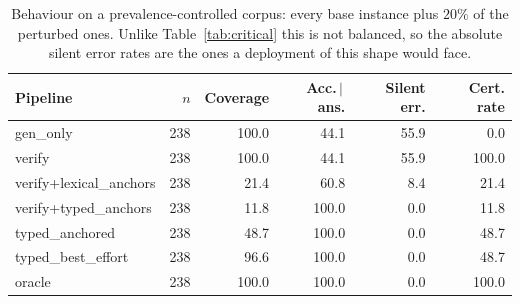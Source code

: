 \begin{table}[t]
\centering
\caption{Behaviour on a prevalence-controlled corpus: every base instance plus $20\%$ of the perturbed ones. Unlike Table~\ref{tab:critical} this is not balanced, so the absolute silent error rates are the ones a deployment of this shape would face.}
\label{tab:mixed}
\small
\begin{tabular}{lrrrrr}
\toprule
Pipeline & $n$ & Coverage & Acc.\,$\mid$\,ans. & Silent err. & Cert. rate \\
\midrule
gen\_only & 238 & 100.0 & 44.1 & 55.9 & 0.0 \\
verify & 238 & 100.0 & 44.1 & 55.9 & 100.0 \\
verify+lexical\_anchors & 238 & 21.4 & 60.8 & 8.4 & 21.4 \\
verify+typed\_anchors & 238 & 11.8 & 100.0 & 0.0 & 11.8 \\
typed\_anchored & 238 & 48.7 & 100.0 & 0.0 & 48.7 \\
typed\_best\_effort & 238 & 96.6 & 100.0 & 0.0 & 48.7 \\
oracle & 238 & 100.0 & 100.0 & 0.0 & 100.0 \\
\bottomrule
\end{tabular}
\end{table}
